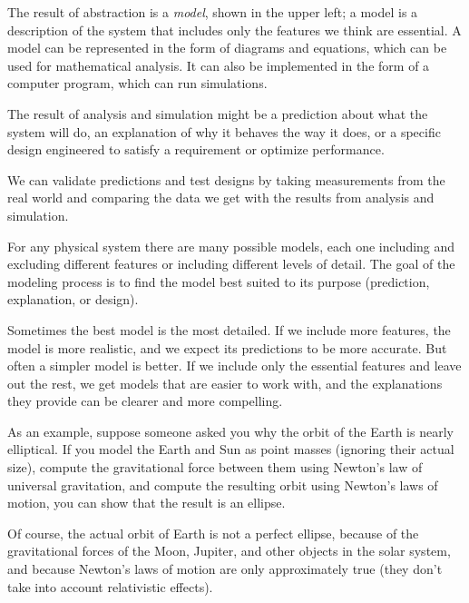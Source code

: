 

The result of abstraction is a \emph{model}, shown in the upper left; a model is a description of the system that includes only the features we think are essential.  A model can be represented in the form of diagrams and equations, which can be used for mathematical analysis.  It can also be implemented in the form of a computer program, which can run simulations.


The result of analysis and simulation might be a prediction about what the system will do, an explanation of why it behaves the way it does, or a specific design engineered to satisfy a requirement or optimize performance.


We can validate predictions and test designs by taking measurements from the real world and comparing the data we get with the results from analysis and simulation.


For any physical system there are many possible models, each one including and excluding different features or including different levels of detail.  The goal of the modeling process is to find the model best suited to its purpose (prediction, explanation, or design).


Sometimes the best model is the most detailed.  If we include more features, the model is more realistic, and we expect its predictions to be more accurate. 
But often a simpler model is better.  If we include only the essential features and leave out the rest, we get models that are easier to work with, and the explanations they provide can be clearer and more compelling. 

As an example, suppose someone asked you why the orbit of the Earth is nearly elliptical.  If you model the Earth and Sun as point masses (ignoring their actual size), compute the gravitational force between them using Newton's law of universal gravitation, and compute the resulting orbit  using Newton's laws of motion, you can show that the result is an ellipse.

Of course, the actual orbit of Earth is not a perfect ellipse, because of the gravitational forces of the Moon, Jupiter, and other objects in the solar system, and because Newton's laws of motion are only approximately true (they don't take into account relativistic effects).
%
%

